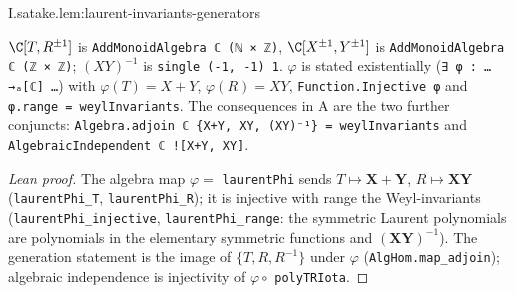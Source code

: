 \begin{lemma}
\end{lemma}
\begin{tfformal}{I.satake.lem:laurent-invariants-generators}
\begin{tffidelity}
$\C[T,R^{\pm1}]$ is \texttt{AddMonoidAlgebra ℂ (ℕ × ℤ)}, $\C[X^{\pm1},Y^{\pm1}]$ is \texttt{AddMonoidAlgebra ℂ (ℤ × ℤ)}; $(XY)^{-1}$ is \texttt{single (-1, -1) 1}. $\varphi$ is stated existentially (\texttt{∃ φ : … →ₐ[ℂ] …}) with $\varphi(T)=X+Y$, $\varphi(R)=XY$, \texttt{Function.Injective φ} and \texttt{φ.range = weylInvariants}. The consequences in A are the two further conjuncts: \texttt{Algebra.adjoin ℂ \{X+Y, XY, (XY)⁻¹\} = weylInvariants} and \texttt{AlgebraicIndependent ℂ ![X+Y, XY]}.
\end{tffidelity}
\end{tfformal}
\begin{proof}[Lean proof]
The algebra map $\varphi=$ \texttt{laurentPhi} sends $T\mapsto\mathbf X+\mathbf Y$, $R\mapsto\mathbf X\mathbf Y$ (\texttt{laurentPhi\_T}, \texttt{laurentPhi\_R}); it is injective with range the Weyl-invariants (\texttt{laurentPhi\_injective}, \texttt{laurentPhi\_range}: the symmetric Laurent polynomials are polynomials in the elementary symmetric functions and $(\mathbf X\mathbf Y)^{-1}$). The generation statement is the image of $\{T,R,R^{-1}\}$ under $\varphi$ (\texttt{AlgHom.map\_adjoin}); algebraic independence is injectivity of $\varphi\circ$ \texttt{polyTRIota}.
\end{proof}

